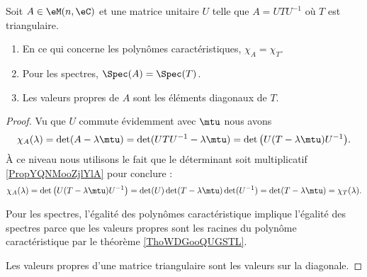 \begin{lemma}       \label{LEMooRCFGooPPXiKi}
    Soit \( A\in \eM(n,\eC)\) et une matrice unitaire \( U\) telle que \( A=UTU^{-1}\) où \( T\) est triangulaire. 
    \begin{enumerate}
        \item
            En ce qui concerne les polynômes caractéristiques, \( \chi_A=\chi_T\).
        \item
            Pour les spectres, \( \Spec(A)=\Spec(T)\).
        \item
            Les valeurs propres de \( A\) sont les éléments diagonaux de \( T\).
    \end{enumerate}
\end{lemma}

\begin{proof}
    Vu que \( U\) commute évidemment avec \( \mtu\) nous avons
    \begin{equation}
        \chi_A(\lambda)=\det(A-\lambda \mtu)=\det(UTU^{-1}-\lambda\mtu)=\det\big( U(T-\lambda\mtu)U^{-1} \big).
    \end{equation}
    À ce niveau nous utilisons le fait que le déterminant soit multiplicatif \ref{PropYQNMooZjlYlA} pour conclure :
    \begin{equation}
        \chi_A(\lambda)=\det\big( U(T-\lambda\mtu)U^{-1} \big)=\det(U)\det(T-\lambda\mtu)\det(U^{-1})=\det(T-\lambda\mtu)=\chi_T(\lambda).
    \end{equation}

    Pour les spectres, l'égalité des polynômes caractéristique implique l'égalité des spectres parce que les valeurs propres sont les racines du polynôme caractéristique par le théorème \ref{ThoWDGooQUGSTL}.
    
    Les valeurs propres d'une matrice triangulaire sont les valeurs sur la diagonale.
\end{proof}


